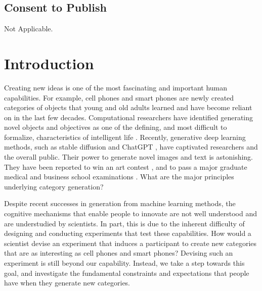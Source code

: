 \documentclass[pdflatex,sn-apa]{sn-jnl}%
\theoremstyle{thmstyleone}%
\theoremstyle{thmstyletwo}%
\theoremstyle{thmstylethree}%
\begin{document}
\subsection{Consent to Publish}
Not Applicable.

\newpage

\section{Introduction}\label{sec1}
Creating new ideas is one of the most fascinating and important
human capabilities. For example, cell phones and smart phones are newly created
categories of objects that young and old adults learned and have become reliant
on in the last few decades. Computational researchers have identified
generating novel objects and objectives as one of the defining, and most
difficult to formalize, characteristics of intelligent life
\citep{lake2017,lehman2011,taylor2016}. Recently, generative deep learning methods, such as stable diffusion \cite{rombach2022} and ChatGPT \cite{chatgpt2022}, have captivated researchers and the overall public. Their power to generate novel images and text is astonishing. They have been reported to win an art contest \cite{roose2022}, and to pass a major graduate medical and business school examinations \cite{kung2022,terwiesch2023}. What are the major principles underlying category generation?

Despite recent successes in generation from machine learning methods, the cognitive mechanisms that enable people to innovate are not well understood and
are understudied by scientists. In part, this is due to the inherent difficulty
of designing and conducting experiments that test these capabilities. How would
a scientist devise an experiment that induces a participant to create 
new categories that are as interesting as cell phones and smart phones? Devising such an experiment is still beyond our capability. Instead, we take a step towards this goal, and investigate the fundamental constraints and expectations that people have when they generate new categories.

\end{document}
